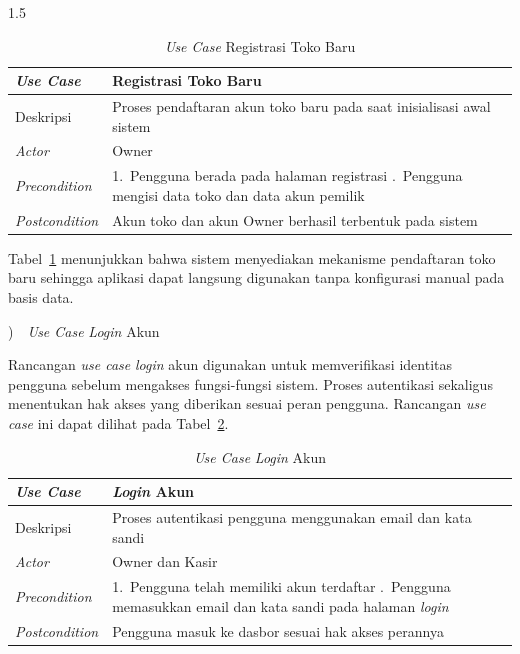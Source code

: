 \documentclass[12pt, a4paper, onecolumn, oneside]{report}
\begin{document}
\begin{spacing}{1.5}
\begin{table}[H]
\centering
\caption{\textit{Use Case} Registrasi Toko Baru}
\label{tab:uc-registrasi}
\begin{tabularx}{\textwidth}{|p{3.2cm}|X|}
\hline
\textbf{\textit{Use Case}} & \textbf{Registrasi Toko Baru} \\ \hline
Deskripsi & Proses pendaftaran akun toko baru pada saat inisialisasi awal sistem \\ \hline
\textit{Actor} & Owner \\ \hline
\textit{Precondition} & 1.~Pengguna berada pada halaman registrasi \newline 2.~Pengguna mengisi data toko dan data akun pemilik \\ \hline
\textit{Postcondition} & Akun toko dan akun Owner berhasil terbentuk pada sistem \\ \hline
\end{tabularx}
\end{table}

Tabel~\ref{tab:uc-registrasi} menunjukkan bahwa sistem menyediakan mekanisme pendaftaran toko baru sehingga aplikasi dapat langsung digunakan tanpa konfigurasi manual pada basis data.

)~~\textit{Use Case} \textit{Login} Akun

Rancangan \textit{use case} \textit{login} akun digunakan untuk memverifikasi identitas pengguna sebelum mengakses fungsi-fungsi sistem. Proses autentikasi sekaligus menentukan hak akses yang diberikan sesuai peran pengguna. Rancangan \textit{use case} ini dapat dilihat pada Tabel~\ref{tab:uc-login}.

\begin{table}[H]
\centering
\caption{\textit{Use Case} \textit{Login} Akun}
\label{tab:uc-login}
\begin{tabularx}{\textwidth}{|p{3.2cm}|X|}
\hline
\textbf{\textit{Use Case}} & \textbf{\textit{Login} Akun} \\ \hline
Deskripsi & Proses autentikasi pengguna menggunakan email dan kata sandi \\ \hline
\textit{Actor} & Owner dan Kasir \\ \hline
\textit{Precondition} & 1.~Pengguna telah memiliki akun terdaftar \newline 2.~Pengguna memasukkan email dan kata sandi pada halaman \textit{login} \\ \hline
\textit{Postcondition} & Pengguna masuk ke dasbor sesuai hak akses perannya \\ \hline
\end{tabularx}
\end{table}


\end{spacing}
\end{document}
